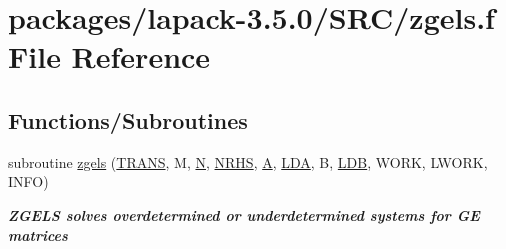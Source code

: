 \hypertarget{zgels_8f}{}\section{packages/lapack-\/3.5.0/\+S\+R\+C/zgels.f File Reference}
\label{zgels_8f}
\subsection*{Functions/\+Subroutines}
\begin{DoxyCompactItemize}
\item 
subroutine \hyperlink{group__complex16GEsolve_ga1d8089ba1e1538eb3d1ab0ebe97596c7}{zgels} (\hyperlink{superlu__enum__consts_8h_a0c4e17b2d5cea33f9991ccc6a6678d62a1f61e3015bfe0f0c2c3fda4c5a0cdf58}{T\+R\+A\+N\+S}, M, \hyperlink{polmisc_8c_a0240ac851181b84ac374872dc5434ee4}{N}, \hyperlink{example__user_8c_aa0138da002ce2a90360df2f521eb3198}{N\+R\+H\+S}, \hyperlink{classA}{A}, \hyperlink{example__user_8c_ae946da542ce0db94dced19b2ecefd1aa}{L\+D\+A}, B, \hyperlink{example__user_8c_a50e90a7104df172b5a89a06c47fcca04}{L\+D\+B}, W\+O\+R\+K, L\+W\+O\+R\+K, I\+N\+F\+O)
\begin{DoxyCompactList}\small\item\em {\bfseries  Z\+G\+E\+L\+S solves overdetermined or underdetermined systems for G\+E matrices} \end{DoxyCompactList}\end{DoxyCompactItemize}
